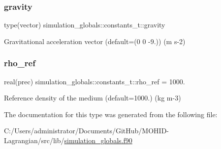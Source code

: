 \subsubsection{\texorpdfstring{gravity}{gravity}}
{\footnotesize\ttfamily type(vector) simulation\+\_\+globals\+::constants\+\_\+t\+::gravity\hspace{0.3cm}{\ttfamily [private]}}



Gravitational acceleration vector (default=(0 0 -\/9.)) (m s-\/2) 

\mbox{\label{structsimulation__globals_1_1constants__t_af9496305e46cea74e54758362274a701}} 
\subsubsection{\texorpdfstring{rho\+\_\+ref}{rho\_ref}}
{\footnotesize\ttfamily real(prec) simulation\+\_\+globals\+::constants\+\_\+t\+::rho\+\_\+ref = 1000.\hspace{0.3cm}{\ttfamily [private]}}



Reference density of the medium (default=1000.) (kg m-\/3) 



The documentation for this type was generated from the following file\+:\begin{DoxyCompactItemize}
\item 
C\+:/\+Users/administrator/\+Documents/\+Git\+Hub/\+M\+O\+H\+I\+D-\/\+Lagrangian/src/lib/\mbox{\hyperlink{simulation__globals_8f90}{simulation\+\_\+globals.\+f90}}\end{DoxyCompactItemize}
